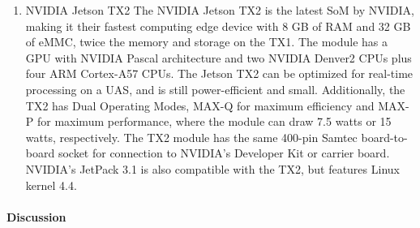 \begin{enumerate}
		\item{NVIDIA Jetson TX2}
			The NVIDIA Jetson TX2 is the latest SoM by NVIDIA, making it their fastest computing edge
			device with 8 GB of RAM and 32 GB of eMMC, twice the memory and storage on the TX1. The 
			module has a GPU with NVIDIA Pascal architecture and two NVIDIA Denver2 CPUs plus four 
			ARM Cortex-A57 CPUs\cite{TX2Wiki, JetsonFAQ}. The Jetson TX2 can be optimized for 
			real-time processing on a UAS, and is 
			still power-efficient and small\cite{JetsonGenius}. Additionally, the TX2 has 
			Dual Operating Modes, MAX-Q for maximum efficiency and MAX-P for maximum performance, 
			where the module can draw 7.5 watts or 15 watts, respectively\cite{TechnoByte}. The TX2 
			module has the same 400-pin Samtec board-to-board socket for connection to NVIDIA's 
			Developer Kit or carrier board. \\

			NVIDIA's JetPack 3.1 is also compatible with the TX2, but features Linux kernel 
			4.4\cite{TX2Wiki, JetPackRel}.\\
	\end{enumerate}


\paragraph{Discussion}

